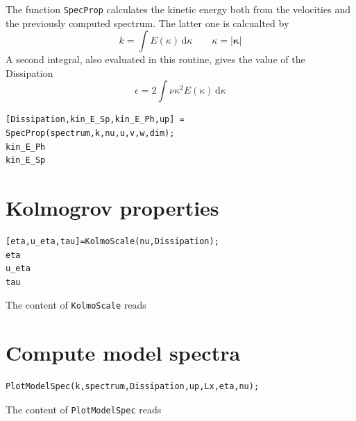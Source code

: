 \documentclass[preprint,12pt,ntfdMod]{elsarticle}
\begin{document}
\begin{par}

  The function \lstinline!SpecProp! calculates the kinetic energy both
  from the velocities and the previously computed spectrum. The latter
  one is calcualted by
  \begin{equation}
      k = \int E(\kappa)\,\mathrm{d}\kappa\qquad \kappa=|\boldsymbol\kappa|
  \end{equation}
  A second integral, also evaluated in this routine, gives the value
  of the Dissipation
  \begin{equation}
      \epsilon = 2\int\nu\kappa^2 E(\kappa)\,\mathrm{d}\kappa
  \end{equation}

\end{par} \vspace{1em}
\begin{lstlisting}
[Dissipation,kin_E_Sp,kin_E_Ph,up] = SpecProp(spectrum,k,nu,u,v,w,dim);
kin_E_Ph
kin_E_Sp
\end{lstlisting}
\begin{par}



\end{par} \vspace{1em}


\section{Kolmogrov properties}

\begin{lstlisting}
[eta,u_eta,tau]=KolmoScale(nu,Dissipation);
eta
u_eta
tau
\end{lstlisting}
\begin{par}

The content of \verb|KolmoScale| reads


\end{par} \vspace{1em}


\section{Compute model spectra}

\begin{lstlisting}
PlotModelSpec(k,spectrum,Dissipation,up,Lx,eta,nu);
\end{lstlisting}
\begin{par}

The content of \verb|PlotModelSpec| reads


\end{par} \vspace{1em}
\end{document}
